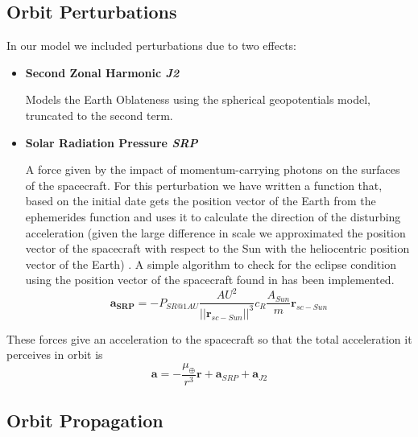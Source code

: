 \documentclass[11pt,a4paper]{report}
\renewcommand{\vec}[1]{\mathbf{#1}}
\begin{document}
\subsection{Orbit Perturbations}
In our model we included perturbations due to two effects:
\begin{itemize}
    \item \textbf{Second Zonal Harmonic \emph{J2}} \par Models the Earth Oblateness using the spherical geopotentials model, truncated to the second term.
    \item \textbf{Solar Radiation Pressure \emph{SRP}} \par A force given by the impact of momentum-carrying photons on the surfaces of the spacecraft. For this perturbation we have written a function that, based on the initial date gets the position vector of the Earth from the ephemerides function and uses it to calculate the direction of the disturbing acceleration (given the large difference in scale we approximated the position vector of the spacecraft with respect to the Sun with the heliocentric position vector of the Earth) . A simple algorithm to check for the eclipse condition using the position vector of the spacecraft found in \cite{SRP_Curtis} has been implemented.
    \begin{equation}
        \vec{a_{SRP}} = -P_{SR@1AU}\frac{AU^2}{||\vec{r}_{sc-Sun}||^3}c_R\frac{A_{Sun}}{m}\vec{r}_{sc-Sun}
    \end{equation}
\end{itemize}

These forces give an acceleration to the spacecraft so that the total acceleration it perceives in orbit is
\begin{equation}
    \vec{a} = - \frac{\mu_{\oplus}}{r^3}\vec{r} + \vec{a}_{SRP} + \vec{a}_{J2}
\end{equation}

\subsection{Orbit Propagation}
\end{document}
